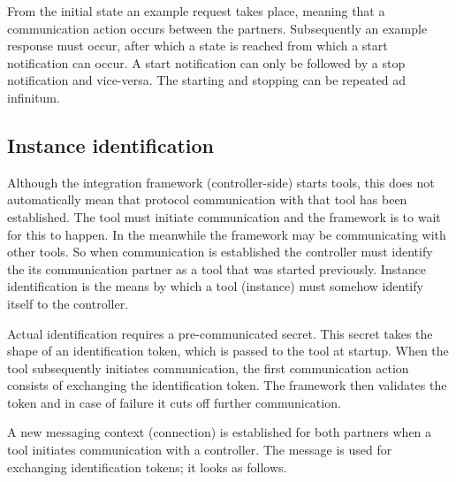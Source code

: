 \documentclass{article}
\begin{document}
   \noindent From the initial state an example request takes place, meaning that a
   communication action occurs between the partners. Subsequently an example
   response must occur, after which a state is reached from which a start
   notification can occur. A start notification can only be followed by a stop
   notification and vice-versa. The starting and stopping can be repeated ad
   infinitum.

  \subsection{Instance identification} \label{s:instance_identification}

   Although the integration framework (controller-side) starts tools, this
   does not automatically mean that protocol communication with that tool has
   been established. The tool must initiate communication and the framework is
   to wait for this to happen. In the meanwhile the framework may be
   communicating with other tools. So when communication is established the
   controller must identify the its communication partner as a tool that was
   started previously. Instance identification is the means by which a tool
   (instance) must somehow identify itself to the controller.
   
   Actual identification requires a pre-communicated secret. This secret takes
   the shape of an identification token, which is passed to the tool at
   startup.  When the tool subsequently initiates communication, the first
   communication action consists of exchanging the identification token. The
   framework then validates the token and in case of failure it cuts off
   further communication.

   A new messaging context (connection) is established for both partners when a
   tool initiates communication with a controller. The  message is used for exchanging identification tokens; it looks
   as follows.
\end{document}
